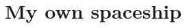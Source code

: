 \documentclass[
	letterpaper, %
	10pt, %
]{CSUniSchoolLabReport}
\begin{document}
\section{My own spaceship}

\subsection*{}

\printbibliography%

\end{document}
